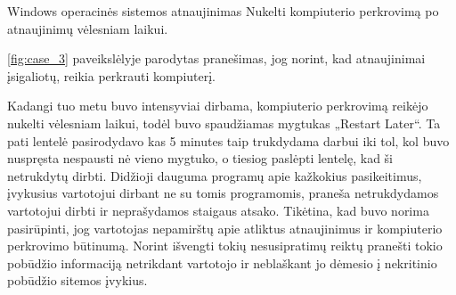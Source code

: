 ﻿\begin{xcase}{Windows operacinės sistemos atnaujinimas}
  \xcgoal
  {
    Nukelti kompiuterio perkrovimą po atnaujinimų vėlesniam laikui.
  }
  \xctools
  {
    \ref{fig:case_3} paveikslėlyje parodytas pranešimas, jog norint, kad atnaujinimai įsigaliotų, 
    reikia perkrauti kompiuterį.

  }
  \xcresult
  {
    Kadangi tuo metu buvo intensyviai dirbama, kompiuterio perkrovimą reikėjo nukelti vėlesniam 
    laikui, todėl buvo spaudžiamas mygtukas „Restart Later“. Ta pati lentelė pasirodydavo kas 5 
    minutes taip trukdydama darbui iki tol, kol buvo nuspręsta nespausti nė vieno mygtuko, o 
    tiesiog paslėpti lentelę, kad ši netrukdytų dirbti.
  }
  \xcprinciples
  {
    {
      Didžioji dauguma programų apie kažkokius pasikeitimus, įvykusius vartotojui dirbant ne su 
      tomis programomis, praneša netrukdydamos vartotojui dirbti ir neprašydamos staigaus atsako.
    }
  }
  \xcthoughts
  {
    Tikėtina, kad buvo norima pasirūpinti, jog vartotojas nepamirštų apie atliktus atnaujinimus 
    ir kompiuterio perkrovimo būtinumą. Norint išvengti tokių nesusipratimų reiktų pranešti 
    tokio pobūdžio informaciją netrikdant vartotojo ir neblaškant jo dėmesio į nekritinio
    pobūdžio sitemos įvykius.
  }
\end{xcase}
